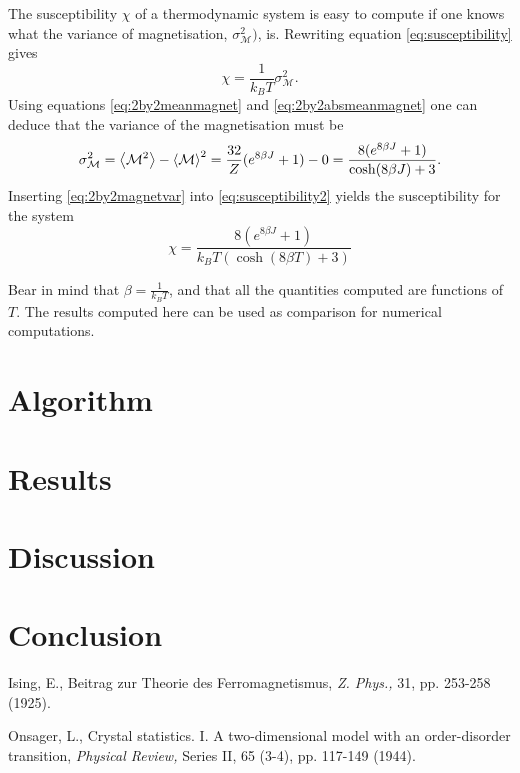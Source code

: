 \documentclass[10pt,a4paper]{amsart}
\begin{document}
The susceptibility $\chi$ of a thermodynamic system is easy to compute if one knows what the variance of magnetisation, $\sigma_{\mathcal{M}}^2)$, is. Rewriting equation \ref{eq:susceptibility} gives
\begin{equation}
\label{eq:susceptibility2}
\chi = \frac{1}{k_BT}\sigma_{\mathcal{M}}^2.
\end{equation}
Using equations \ref{eq:2by2meanmagnet} and \ref{eq:2by2absmeanmagnet} one can deduce that the variance of the magnetisation must be
\begin{equation}
\label{eq:2by2magnetvar}
\sigma_{\mathcal{M}}^2 = \ev{\mathcal{M}^2} - \ev{\mathcal{M}}^2 = \frac{32}{Z}(e^{8\beta J} +1) - 0 = \frac{8(e^{8\beta J} + 1)}{\cosh(8\beta J) + 3}.
\end{equation}
Inserting \ref{eq:2by2magnetvar} into \ref{eq:susceptibility2} yields the susceptibility for the system
\begin{equation}
\label{eq:2by2susceptibility}
\chi = \frac{8(e^{8\beta J}+1)}{k_BT(\cosh(8\beta T) + 3)}
\end{equation}

Bear in mind that $\beta = \frac{1}{k_BT}$, and that all the quantities computed are functions of $T$. The results computed here can be used as comparison for numerical computations.

\section{Algorithm}

\section{Results}

\section{Discussion}

\section{Conclusion}

\begin{thebibliography}{9}

 Ising, E., Beitrag zur Theorie des Ferromagnetismus,
	\emph{Z. Phys.,} 31, pp. 253-258 (1925).

 Onsager, L., Crystal statistics. I. A two-dimensional model with an order-disorder transition,
	\emph{Physical Review,} Series II, 65 (3-4), pp. 117-149 (1944).

\end{thebibliography}
\end{document}
